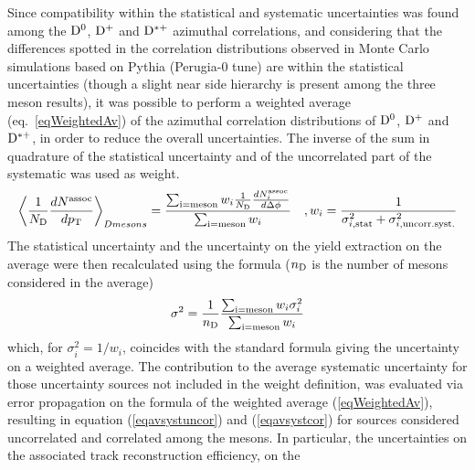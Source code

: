 %
%
%
%
Since compatibility within the statistical and systematic uncertainties was found among the ${\rm D^0}$, ${\rm D^+}$ and ${\rm D^{*+}}$ azimuthal correlations, and considering that the differences spotted in the correlation distributions observed in Monte Carlo simulations based on Pythia (Perugia-0 tune) are within the statistical uncertainties (though a slight near side hierarchy is present among the three meson results),
it was possible to perform a weighted average (eq.~\ref{eqWeightedAv}) of the azimuthal correlation distributions of ${\rm D^0}$, ${\rm D^+}$ and ${\rm D^{*+}}$, in order to reduce the overall uncertainties. The inverse of the sum in quadrature of the statistical uncertainty and of the uncorrelated part of the systematic was used as weight. %
\begin{equation}
  \left \langle \frac{1}{N_{\rm D}}\frac{dN^{\rm assoc}}{dp_{\rm T}} \right \rangle_{D mesons} =  \frac{\sum_{\rm i=meson}w_{i}\frac{1}{N_{\rm D}}\frac{dN^{\rm assoc}_{i}}{d\Delta\phi}}{\sum_{\rm i=meson}w_{i}}\quad , w_{i}=\frac{1}{\sigma^{2}_{i, \rm stat}+\sigma^{2}_{i, \rm uncorr. syst.}}
\label{eqWeightedAv}
\end{equation}
The statistical uncertainty and the uncertainty on the yield extraction on the average were then recalculated using the formula ($n_{\rm D}$ is the number of mesons considered in the average)
\begin{equation}
  \sigma^{2}=\frac{1}{n_{\rm D}}\frac{\sum_{\rm i=meson}w_{i}\sigma^{2}_{i}}{\sum_{\rm i=meson}w_{i}}
\end{equation}
which, for $\sigma^{2}_{i}=1/w_{i}$, coincides with the standard formula giving the uncertainty on a weighted average.
 The contribution to the average systematic uncertainty for those uncertainty sources
not included in the weight definition, was evaluated via error propagation on the formula of
the weighted average (\ref{eqWeightedAv}), resulting in equation (\ref{eqavsystuncor}) and (\ref{eqavsystcor}) for sources
considered uncorrelated and correlated among the mesons. In particular, the uncertainties on the associated track reconstruction efficiency, on the
